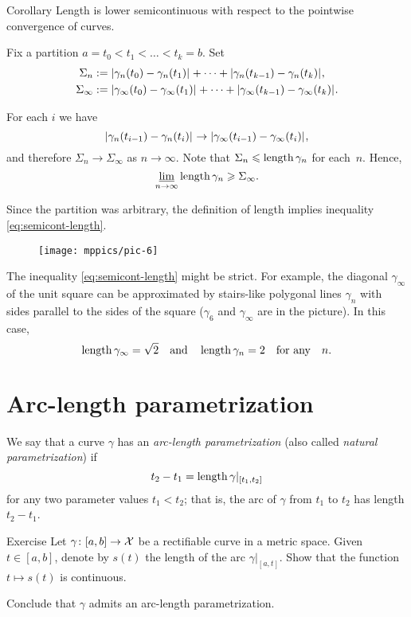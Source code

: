 \begin{thm}{Corollary}\label{thm:length-semicont}
Length is lower semicontinuous with respect to the pointwise convergence of curves. 
\end{thm}

Fix a partition $a=t_0<t_1<\dots<t_k=b$.
Set 
\begin{align*}\Sigma_n
&\df
\dist{\gamma_n(t_0)}{\gamma_n(t_1)}{}
+\dots+
\dist{\gamma_n(t_{k-1})}{\gamma_n(t_k)}{},
\\
\Sigma_\infty
&\df
\dist{\gamma_\infty(t_0)}{\gamma_\infty(t_1)}{}
+\dots+
\dist{\gamma_\infty(t_{k-1})}{\gamma_\infty(t_k)}{}.
\end{align*}

For each $i$ we have 
\[\dist{\gamma_n(t_{i-1})}{\gamma_n(t_i)}{}
\to
\dist{\gamma_\infty(t_{i-1})}{\gamma_\infty(t_i)}{},\]
and therefore
$\Sigma_n\to \Sigma_\infty$
as $n\to\infty$.
Note that 
$\Sigma_n\leqslant\mathop{\rm length}\nolimits\gamma_n$
for each~$n$.
Hence,
$$\varliminf_{n\to\infty} \mathop{\rm length}\nolimits\gamma_n \geqslant \Sigma_\infty.$$

  
Since the partition was arbitrary, the definition of length implies inequality \ref{eq:semicont-length}.
\qeds


\begin{wrapfigure}{o}{20 mm}
\vskip3mm
\centering
\texttt{[image: mppics/pic-6]}
\end{wrapfigure}


The inequality \ref{eq:semicont-length} might be strict.
For example, the diagonal $\gamma_\infty$ of the unit square 
can be approximated by stairs-like polygonal lines $\gamma_n$
with sides parallel to the sides of the square ($\gamma_6$ and $\gamma_\infty$ are in the picture).
In this case,
\[\mathop{\rm length}\nolimits\gamma_\infty=\sqrt{2}
\quad
\text{and}\quad
\mathop{\rm length}\nolimits\gamma_n=2
\quad
\text{for any}\quad
n.\]

  
\section{Arc-length parametrization}

We say that a curve $\gamma$ has an \emph{arc-length parametrization} (also called \emph{natural parametrization})
if 
\[t_2-t_1=\mathop{\rm length}\nolimits \gamma|_{[t_1,t_2]}\]
for any two parameter values $t_1<t_2$;
that is, the arc of $\gamma$ from $t_1$ to $t_2$ has length $t_2-t_1$.

\begin{thm}{Exercise}\label{ex:cont-length}
Let  $\gamma\colon[a,b]\to \mathcal{X}$ be a rectifiable curve in a metric space.
Given $t\in [a,b]$, denote by $s(t)$ the length of the arc $\gamma|_{[a,t]}$.
Show that the function $t\mapsto s(t)$ is continuous.

Conclude that $\gamma$ admits an arc-length parametrization.
\end{thm}

